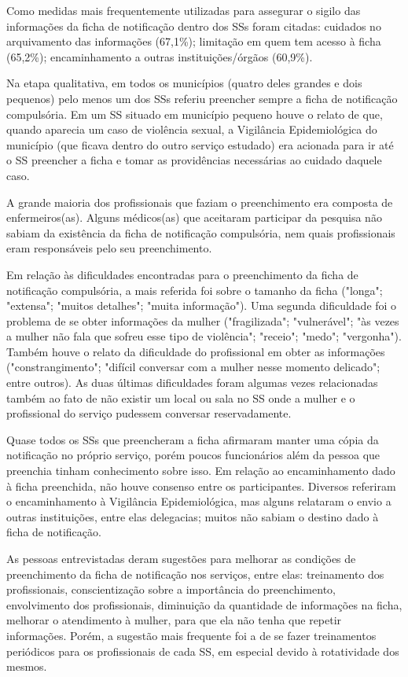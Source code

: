 \documentclass{article}
\begin{document}
Como medidas mais frequentemente utilizadas para assegurar o sigilo das
informações da ficha de notificação dentro dos SSs foram citadas: cuidados no
arquivamento das informações (67,1\%); limitação em quem tem acesso à ficha
(65,2\%); encaminhamento a outras instituições/órgãos (60,9\%).

Na etapa qualitativa, em todos os municípios (quatro deles grandes e dois
pequenos) pelo menos um dos SSs referiu preencher sempre a ficha de notificação
compulsória. Em um SS situado em município pequeno houve o relato de que, quando
aparecia um caso de violência sexual, a Vigilância Epidemiológica do município
(que ficava dentro do outro serviço estudado) era acionada para ir até o SS
preencher a ficha e tomar as providências necessárias ao cuidado daquele caso.

A grande maioria dos profissionais que faziam o preenchimento era composta de
enfermeiros(as). Alguns médicos(as) que aceitaram participar da pesquisa não
sabiam da existência da ficha de notificação compulsória, nem quais
profissionais eram responsáveis pelo seu preenchimento.

Em relação às dificuldades encontradas para o preenchimento da ficha de
notificação compulsória, a mais referida foi sobre o tamanho da ficha ("longa";
"extensa"; "muitos detalhes"; "muita informação"). Uma segunda dificuldade foi o
problema de se obter informações da mulher ("fragilizada"; "vulnerável"; "às
vezes a mulher não fala que sofreu esse tipo de violência"; "receio"; "medo";
"vergonha"). Também houve o relato da dificuldade do profissional em obter as
informações ("constrangimento"; "difícil conversar com a mulher nesse momento
delicado"; entre outros). As duas últimas dificuldades foram algumas vezes
relacionadas também ao fato de não existir um local ou sala no SS onde a mulher
e o profissional do serviço pudessem conversar reservadamente.

Quase todos os SSs que preencheram a ficha afirmaram manter uma cópia da
notificação no próprio serviço, porém poucos funcionários além da pessoa que
preenchia tinham conhecimento sobre isso. Em relação ao encaminhamento dado à
ficha preenchida, não houve consenso entre os participantes. Diversos referiram
o encaminhamento à Vigilância Epidemiológica, mas alguns relataram o envio a
outras instituições, entre elas delegacias; muitos não sabiam o destino dado à
ficha de notificação.

As pessoas entrevistadas deram sugestões para melhorar as condições de
preenchimento da ficha de notificação nos serviços, entre elas: treinamento dos
profissionais, conscientização sobre a importância do preenchimento,
envolvimento dos profissionais, diminuição da quantidade de informações na
ficha, melhorar o atendimento à mulher, para que ela não tenha que repetir
informações. Porém, a sugestão mais frequente foi a de se fazer treinamentos
periódicos para os profissionais de cada SS, em especial devido à rotatividade
dos mesmos.
\end{document}
